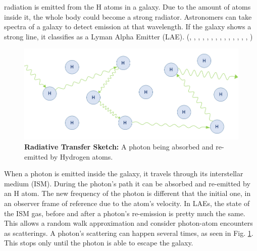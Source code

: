 \lya radiation is emitted from the H atoms in a galaxy. Due to the amount of atoms inside it, the whole body could become a strong \lya radiator. Astronomers can take spectra of a galaxy to detect emission at that wavelength. If the galaxy shows a strong \lya line, it classifies as a Lyman Alpha Emitter (LAE). (\cite{DjorgovskiThompson}, \cite{Rhoads00}, \cite{Gawiser2007}, \cite{Koehler2007}, \cite{Ouchi08}, \cite{Yamada2012}, \cite{Schenker2012}, \cite{Kulas12}, \cite{Yamada2012}, \cite{Chonis2013}, \cite{Finkelstein2013}, \cite{Ostlin14}, \cite{Hayes2014}, \cite{Faisst2014}, \cite{Fumagalli2015}) \\


\begin{figure}[h!]
	\begin{center}
		\includegraphics[width=1\textwidth]{./figures/chapter1/radiative_transfer}
	\end{center}
	\caption{\textbf{Radiative Transfer Sketch:} A \lya photon being absorbed and re-emitted by Hydrogen atoms. 
		\label{fig:radiative_transfer}}
\end{figure}

When a \lya photon is emitted inside the galaxy, it travels through its interstellar medium (ISM). During the photon's path it can be absorbed and re-emitted by an H atom. The new frequency of the photon is different that the initial one, in an observer frame of reference due to the atom's velocity. In LAEs, the state of the ISM gas, before and after a photon's re-emission is pretty much the same. This allows a random walk approximation and consider photon-atom encounters as scatterings. A photon's scattering can happen several times, as seen in Fig. \ref{fig:radiative_transfer}. This stops only until the photon is able to escape the galaxy. \\

